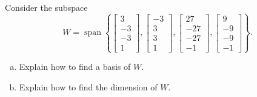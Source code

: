 
\begin{exerciseStatement}


Consider the subspace \[W=\operatorname{span}  \left\{ \left[\begin{array}{c}
3 \\
-3 \\
-3 \\
1
\end{array}\right] , \left[\begin{array}{c}
-3 \\
3 \\
3 \\
1
\end{array}\right] , \left[\begin{array}{c}
27 \\
-27 \\
-27 \\
-1
\end{array}\right] , \left[\begin{array}{c}
9 \\
-9 \\
-9 \\
-1
\end{array}\right] \right\} .\]


\begin{enumerate}[(a)]
\item  Explain how to find a basis of \(W\).
\item  Explain how to find the dimension of \(W\).
\end{enumerate}
    
\end{exerciseStatement}
    
